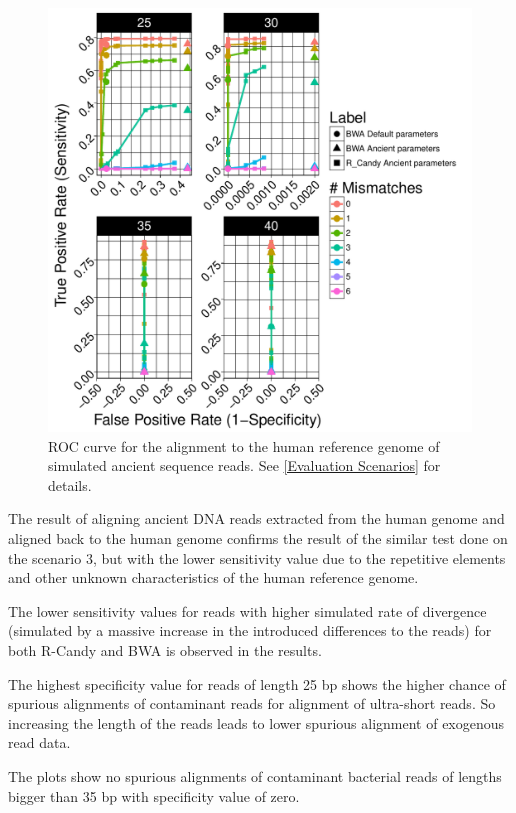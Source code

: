 \documentclass[11pt,a4paper]{report}
\begin{document}
\begin{figure}[H]
\centering
\includegraphics[width=12cm]{pictures/bROC_DS4_emp.pdf}


\caption{
ROC curve for the alignment to the human reference genome of simulated ancient
sequence reads. See \ref{Evaluation Scenarios} for details.
}

\label{DS4_emp}
\end{figure}



The result of aligning ancient DNA reads extracted from the human genome
and aligned back to the human genome confirms the result of the similar
test done on the scenario 3, but with the lower sensitivity value due to 
the repetitive elements and other unknown characteristics of the human 
reference genome.

The lower sensitivity values for reads with higher simulated rate of 
divergence (simulated by a massive increase in the introduced differences
to the reads) for both R-Candy and BWA is observed in the results.

The highest specificity value for reads of length 25 bp shows the higher 
chance of spurious alignments of contaminant reads for alignment of 
ultra-short reads.
So increasing the length of the reads leads to lower spurious alignment 
of exogenous read data.

The plots show no spurious alignments of contaminant bacterial reads of 
lengths bigger than 35 bp with specificity value of zero.
\end{document}
